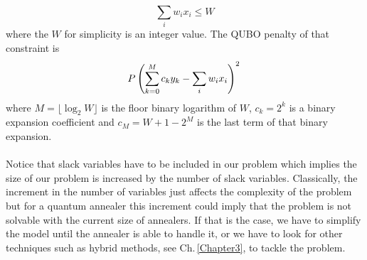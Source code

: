 \begin{equation}
    \sum_{i}w_{i}x_{i}\leq W
\end{equation}
where the $W$ for simplicity is an integer value. The QUBO penalty of that constraint is
\begin{equation}
    P \left(\sum_{k=0}^{M}c_{k}y_{k} - \sum_{i}w_{i}x_{i} \right)^{2} \\
\end{equation}
where $M = \lfloor\log_{2}{W}\rfloor$ is the floor binary logarithm of $W$, $c_{k} = 2^{k}$ is a binary expansion coefficient and $c_{M} = W + 1 - 2^{M}$ is the last term of that binary expansion. \\\\
Notice that slack variables have to be included in our problem which implies the size of our problem is increased by the number of slack variables. Classically, the increment in the number of variables just affects the complexity of the problem but for a quantum annealer this increment could imply that the problem is not solvable with the current size of annealers. If that is the case, we have to simplify the model until the annealer is able to handle it, or we have to look for other techniques such as hybrid methods, see Ch.\,\ref{Chapter3}, to tackle the problem.

